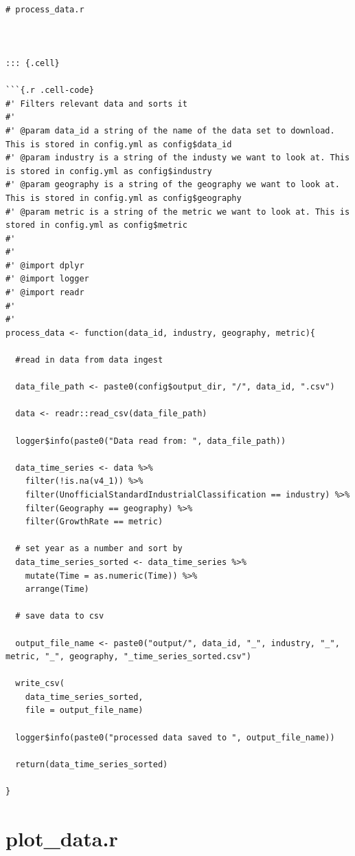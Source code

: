 \documentclass[
  letterpaper,
]{book}
\begin{document}
\begin{verbatim}

# process_data.r



::: {.cell}

```{.r .cell-code}
#' Filters relevant data and sorts it
#'
#' @param data_id a string of the name of the data set to download. This is stored in config.yml as config$data_id
#' @param industry is a string of the industy we want to look at. This is stored in config.yml as config$industry
#' @param geography is a string of the geography we want to look at. This is stored in config.yml as config$geography
#' @param metric is a string of the metric we want to look at. This is stored in config.yml as config$metric
#'
#'
#' @import dplyr
#' @import logger
#' @import readr
#'
#'
process_data <- function(data_id, industry, geography, metric){

  #read in data from data ingest
    
  data_file_path <- paste0(config$output_dir, "/", data_id, ".csv")
      
  data <- readr::read_csv(data_file_path)
      
  logger$info(paste0("Data read from: ", data_file_path))
      
  data_time_series <- data %>%
    filter(!is.na(v4_1)) %>%
    filter(UnofficialStandardIndustrialClassification == industry) %>%
    filter(Geography == geography) %>%
    filter(GrowthRate == metric)
        
  # set year as a number and sort by
  data_time_series_sorted <- data_time_series %>%
    mutate(Time = as.numeric(Time)) %>%
    arrange(Time)
        
  # save data to csv
      
  output_file_name <- paste0("output/", data_id, "_", industry, "_", metric, "_", geography, "_time_series_sorted.csv")
      
  write_csv(
    data_time_series_sorted,
    file = output_file_name)
        
  logger$info(paste0("processed data saved to ", output_file_name))
      
  return(data_time_series_sorted)

}
\end{verbatim}


\hypertarget{plot_data.r}{%
\chapter{plot\_data.r}\label{plot_data.r}}
\end{document}
